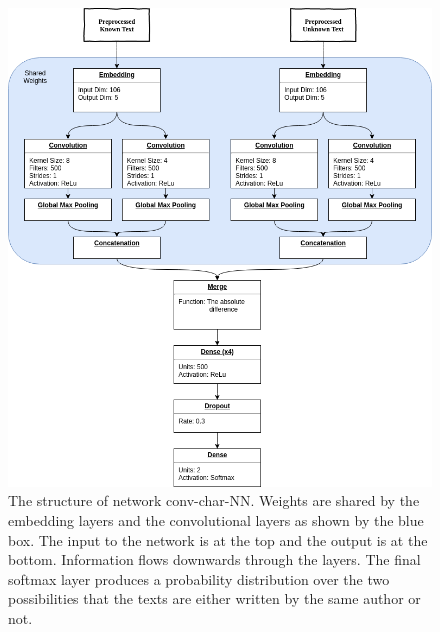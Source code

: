\begin{figure}
    \centering
    \includegraphics[width=\textwidth]{./pictures/experiments/conv_char_nn/model.png}
    \caption{The structure of network \gls{conv-char-NN}. Weights are
        shared by the embedding layers and the convolutional layers as shown by
        the blue box. The input to the network is at the top and the output is
        at the bottom. Information flows downwards through the layers. The final
        softmax layer produces a probability distribution over the two
        possibilities that the texts are either written by the same author or
        not.}
    \label{fig:conv-char-NN}
\end{figure}

